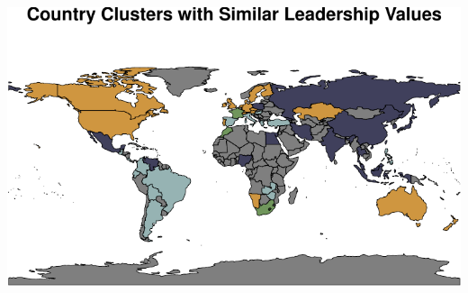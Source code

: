 \documentclass[
]{article}
\begin{document}
\begin{center}\includegraphics[width=0.85\linewidth]{final_report_files/figure-latex/kmeans-1} \end{center}
\begin{table}[h]


\end{table}
\end{document}
